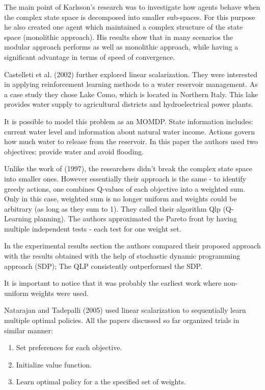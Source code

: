 The main point of Karlsson's research was to investigate how agents behave when the complex state space is decomposed into smaller sub-spaces. For this purpose he also created one agent which maintained a complex structure of the state space (monolithic approach). His results show that in many scenarios the modular approach performs as well as monolithic approach, while having a significant advantage in terms of speed of convergence.

Castelleti et al. (2002)\nocite{castelletti2002reinforcement} further explored linear scalarization. They were interested in applying reinforcement learning methods to a water reservoir management. As a case study they chose Lake Como, which is located in Northern Italy. This lake provides water supply to agricultural districts and hydroelectrical power plants.

It is possible to model this problem as an MOMDP. State information includes: current water level and information about natural water income. Actions govern how much water to release from the reservoir. In this paper the authors used two objectives: provide water and avoid flooding.

Unlike the work of (1997)\nocite{Karlsson97learningto}, the researchers didn't break the complex state space into smaller ones. However essentially their approach is the same - to identify greedy actions, one combines Q-values of each objective into a weighted sum. Only in this case, weighted sum is no longer uniform and weights could be arbitrary (as long as they sum to 1). They called their algorithm Qlp (Q-Learning planning). The authors approximated the Pareto front by having multiple independent tests - each test for one weight set.

In the experimental results section the authors compared their proposed approach with the results obtained with the help of stochastic dynamic programming approach (SDP); The QLP consistently outperformed the SDP.

It is important to notice that it was probably the earliest work where non-uniform weights were used.

Natarajan and Tadepalli (2005)\nocite{natarajan2005dynamic} used linear scalarization to sequentially learn multiple optimal policies. All the papers discussed so far
organized trials in similar manner:

\begin{enumerate}
  \item Set preferences for each objective.
  \item Initialize value function.
  \item Learn optimal policy for a the specified set of weights.
\end{enumerate}

